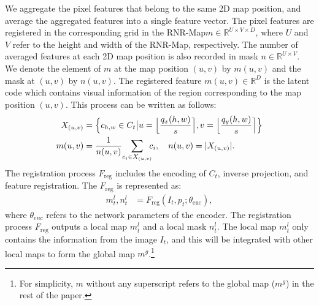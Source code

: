 \documentclass[10pt,twocolumn,letterpaper]{article}
\def\proposed{RNR-Map\xspace}
\begin{document}
%
We aggregate the pixel features that belong to the same 2D map position, and average the aggregated features into a single feature vector.
%
The pixel features are registered in the corresponding grid in the \proposed  $m\in\mathbb{R}^{U \times V \times D}$, where $U$ and $V$ refer to the height and width of the \proposed, respectively.
%
The number of averaged features at each 2D map position is also recorded in mask $n\in\mathbb{R}^{U\times V}$.
%
We denote the element of $m$ at the map position $(u,v)$ by $m(u,v)$ and the mask at $(u,v)$ by $n(u,v)$.
%
The registered feature $m(u,v)\in\mathbb{R}^{D}$ is the latent code which contains visual information of the region corresponding to the map position $(u,v)$.
%
This process can be written as follows:
\begin{align}\label{eq:map_pixel}
\small
    X_{(u,v)} &=  \Bigl\{ c_{h,w} \in C_t \big{|} u = \Bigl\lfloor{{q_x (h,w)}\over{s}}  \Bigr\rceil, v = \Bigl\lfloor{{q_y (h,w)}\over{s}} \Bigr\rceil  \Bigr\}  \notag \\
    m(u,v) &= {{1}\over{n(u,v)}} {\sum_{c_i \in X_{(u,v)}} \!\!\!c_i}, \quad n(u,v) = |X_{(u,v)}|. 
\end{align}
%
The registration process $F_\mathrm{reg}$ includes the encoding of $C_t$, inverse projection, and feature registration.
%
The $F_\mathrm{reg}$ is represented as:%
\vspace{-0.3cm}
\begin{equation} \label{eq:F_reg}
\begin{split}
    m_t^{l}, n_t^{l} &= F_\mathrm{reg}(I_t, p_t; \theta_\mathrm{enc}),
\end{split}
\end{equation}
where $\theta_{enc}$ refers to the network parameters of the encoder.
%
The registration process $F_\mathrm{reg}$ outputs a local map $m_t^{l}$ and a local mask $n_t^{l}$.
% 
The local map $m_t^{l}$ only contains the information from the image $I_t$, and this will be integrated with other local maps to form the global map $m^g$.\footnote{For simplicity, $m$ without any superscript refers to the global map ($m^g$) in the rest of the paper.}
%
\end{document}
